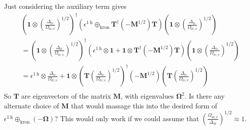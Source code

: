 Just considering the auxiliary term gives
\begin{align}
    &\left( \bm{1} \otimes \left(\frac{\Delta _{lc}}{\Omega _{lc;v}}\right)^{1/2} \right)^\dag \left(\epsilon^{1 \mathrm{~h}} \oplus_{\text{kron}}\bm{T}^\dagger (-{\bm{M}}^{1/2}) \bm{T}\right)\left( \bm{1} \otimes \left(\frac{\Delta _{lc}}{\Omega _{lc;v}}\right)^{1/2} \right) \\
&= \left( \bm{1} \otimes \left(\frac{\Delta _{lc}}{\Omega _{lc;v}}\right)^{1/2} \right)^\dag \left(\epsilon^{1 \mathrm{~h}} \otimes \bm{1} + \bm{1} \otimes \bm{T}^\dagger (-{\bm{M}}^{1/2})\bm{T}\right)\left( \bm{1} \otimes \left(\frac{\Delta _{lc}}{\Omega _{lc;v}}\right)^{1/2} \right) \\
&= \epsilon^{1 \mathrm{~h}} \otimes \frac{\Delta _{lc}}{\Omega _{lc;v}} + \bm{1} \otimes \left(\bm{T}\left(\frac{\Delta _{lc}}{\Omega _{lc;v}}\right)^{1/2}\right)^\dagger (-{\bm{M}}^{1/2})\left(\bm{T}\left(\frac{\Delta _{lc}}{\Omega _{lc;v}}\right)^{1/2}\right) \\
\end{align}
So $\bm{T}$ are eigenvectors of the matrix $\bm{M}$, with eigenvalues $\bm{\Omega }^2$. Is there any alternate choice of $\bm{M}$ that would massage this into the desired form of $\epsilon^{1 \mathrm{~h}} \oplus_{\text{kron}} (-\bm{\Omega })$?
This would only work if we could assume that $\left(\frac{\Omega _{ia;v}}{\Delta _{ia}}\right)^{1/2} \approx 1$. 
